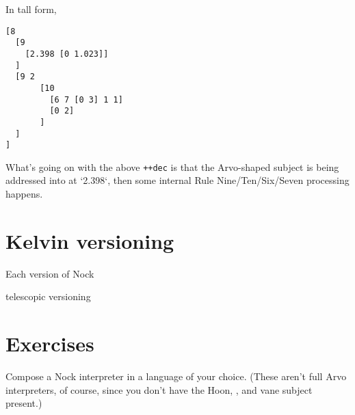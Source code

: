 In tall form,

\begin{lstlisting}
[8
  [9
    [2.398 [0 1.023]]
  ]
  [9 2
       [10
         [6 7 [0 3] 1 1]
         [0 2]
       ]
  ]
]
\end{lstlisting}

What's going on with the above \texttt{++dec} is that the Arvo-shaped subject is being addressed into at `2.398`, then some internal Rule Nine/Ten/Six/Seven processing happens.

\section{Kelvin versioning}

Each version of Nock

telescopic versioning

\section{Exercises}

Compose a Nock interpreter in a language of your choice.  (These aren't full Arvo interpreters, of course, since you don't have the Hoon, \zuse, and vane subject present.)
